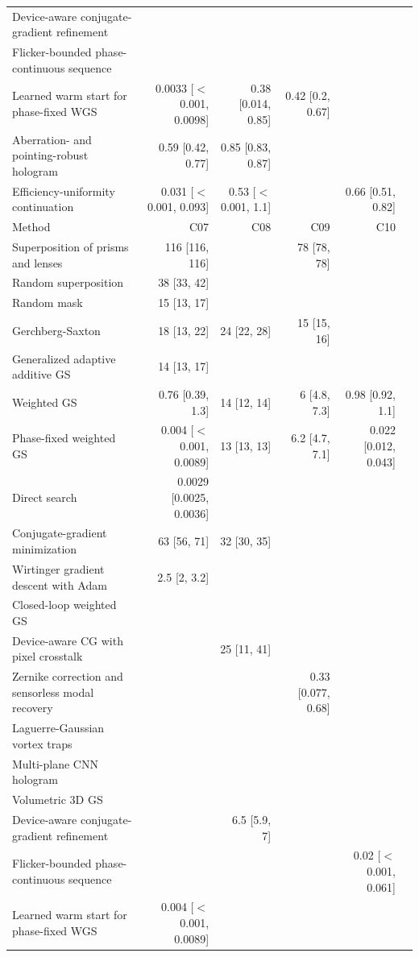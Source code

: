 \begin{longtable}{@{}>{\raggedright\arraybackslash}p{} rrrrr@{}}
Device-aware conjugate-gradient refinement &  &  &  &  & \\
Flicker-bounded phase-continuous sequence &  &  &  &  & \\
Learned warm start for phase-fixed WGS & 0.0033 [$<$0.001, 0.0098] & 0.38 [0.014, 0.85] & 0.42 [0.2, 0.67] &  & \\
Aberration- and pointing-robust hologram & 0.59 [0.42, 0.77] & 0.85 [0.83, 0.87] &  &  & \\
Efficiency-uniformity continuation & 0.031 [$<$0.001, 0.093] & 0.53 [$<$0.001, 1.1] &  & 0.66 [0.51, 0.82] & \\
\midrule
Method & C07 & C08 & C09 & C10 &\\
\midrule
Superposition of prisms and lenses & 116 [116, 116] &  & 78 [78, 78] &  &\\
Random superposition & 38 [33, 42] &  &  &  &\\
Random mask & 15 [13, 17] &  &  &  &\\
Gerchberg-Saxton & 18 [13, 22] & 24 [22, 28] & 15 [15, 16] &  &\\
Generalized adaptive additive GS & 14 [13, 17] &  &  &  &\\
Weighted GS & 0.76 [0.39, 1.3] & 14 [12, 14] & 6 [4.8, 7.3] & 0.98 [0.92, 1.1] &\\
Phase-fixed weighted GS & 0.004 [$<$0.001, 0.0089] & 13 [13, 13] & 6.2 [4.7, 7.1] & 0.022 [0.012, 0.043] &\\
Direct search & 0.0029 [0.0025, 0.0036] &  &  &  &\\
Conjugate-gradient minimization & 63 [56, 71] & 32 [30, 35] &  &  &\\
Wirtinger gradient descent with Adam & 2.5 [2, 3.2] &  &  &  &\\
Closed-loop weighted GS &  &  &  &  &\\
Device-aware CG with pixel crosstalk &  & 25 [11, 41] &  &  &\\
Zernike correction and sensorless modal recovery &  &  & 0.33 [0.077, 0.68] &  &\\
Laguerre-Gaussian vortex traps &  &  &  &  &\\
Multi-plane CNN hologram &  &  &  &  &\\
Volumetric 3D GS &  &  &  &  &\\
Device-aware conjugate-gradient refinement &  & 6.5 [5.9, 7] &  &  &\\
Flicker-bounded phase-continuous sequence &  &  &  & 0.02 [$<$0.001, 0.061] &\\
Learned warm start for phase-fixed WGS & 0.004 [$<$0.001, 0.0089] &  &  &  &\\

\end{longtable}
